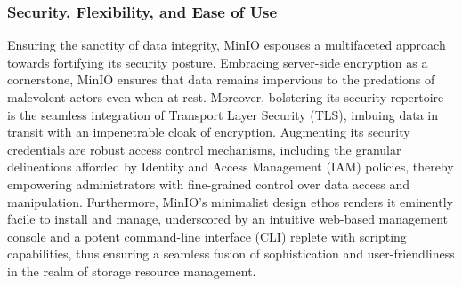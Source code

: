 \subsubsection*{Security, Flexibility, and Ease of Use}
Ensuring the sanctity of data integrity, MinIO espouses a multifaceted approach
towards fortifying its security posture. Embracing server-side encryption as a
cornerstone, MinIO ensures that data remains impervious to the predations of
malevolent actors even when at rest. Moreover, bolstering its security
repertoire is the seamless integration of Transport Layer Security (TLS),
imbuing data in transit with an impenetrable cloak of encryption. Augmenting its
security credentials are robust access control mechanisms, including the
granular delineations afforded by Identity and Access Management (IAM) policies,
thereby empowering administrators with fine-grained control over data access and
manipulation. Furthermore, MinIO's minimalist design ethos renders it eminently
facile to install and manage, underscored by an intuitive web-based management
console and a potent command-line interface (CLI) replete with scripting
capabilities, thus ensuring a seamless fusion of sophistication and
user-friendliness in the realm of storage resource management.
